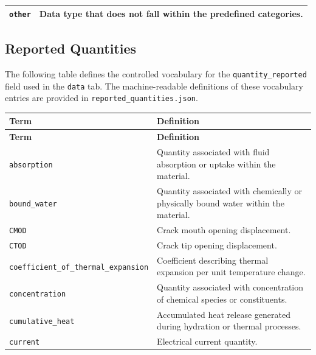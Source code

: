 \documentclass[11pt]{book}
\begin{document}
{\begin{longtable}{p{}p{}}
\texttt{other} &
Data type that does not fall within the predefined categories. \\

\hline
\end{longtable}



\subsection{Reported Quantities}
\label{vocab:reported_quantity_list}

The following table defines the controlled vocabulary for the \texttt{quantity\_reported} field used in the \texttt{data} tab. The machine-readable definitions of these vocabulary entries are provided in \texttt{reported\_quantities.json}.

\begin{longtable}{p{}p{}}
\hline
\textbf{Term} & \textbf{Definition} \\
\hline
\endfirsthead

\hline
\textbf{Term} & \textbf{Definition} \\
\hline
\endhead

\texttt{absorption} &
Quantity associated with fluid absorption or uptake within the material. \\

\texttt{bound\_water} &
Quantity associated with chemically or physically bound water within the material. \\

\texttt{CMOD} &
Crack mouth opening displacement. \\

\texttt{CTOD} &
Crack tip opening displacement. \\

\texttt{coefficient\_of\_thermal\_expansion} &
Coefficient describing thermal expansion per unit temperature change. \\

\texttt{concentration} &
Quantity associated with concentration of chemical species or constituents. \\

\texttt{cumulative\_heat} &
Accumulated heat release generated during hydration or thermal processes. \\

\texttt{current} &
Electrical current quantity. \\


\end{longtable}}
\end{document}
